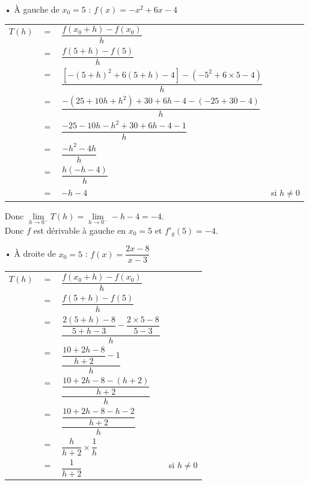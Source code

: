 \begin{itemize}
\item[•] À gauche de $x_0 = 5$ : $f(x) = -x^2 + 6x - 4$ \\

\begin{tabular}{llll}
$T(h)$ & $=$ & $\dfrac{f(x_0 + h) - f(x_0)}{h}$ & \\
& $=$ & $\dfrac{f(5 + h) - f(5)}{h}$ & \\
& $=$ & $\dfrac{\left[-\left(5+h\right)^2 + 6\left(5 + h\right)-4\right]-\left(-5^2 + 6 \times 5 - 4\right)}{h}$ & \\
& $=$ & $\dfrac{-\left(25 + 10h + h^2 \right) + 30 + 6h - 4 -\left(-25 + 30 -4\right)}{h}$ & \\
& $=$ & $\dfrac{-25 - 10h - h^2 + 30 + 6h -4 -1}{h}$ & \\
& $=$ & $\dfrac{-h^2 -4h}{h}$ & \\
& $=$ & $\dfrac{h\left(-h-4\right)}{h}$ & \\
& $=$ & $-h -4$ & si $h \neq 0$ \\
\end{tabular}

Donc $\lim\limits_{h \to 0^-} T(h) = \lim\limits_{h \to 0^-} -h-4 = -4$. \\

Donc $f$ est dérivable à gauche en $x_0 = 5$ et $f'_{g}\left(5\right) = -4$. \\

\item[•]  À droite de $x_0 = 5$ : $f(x) = \dfrac{2x-8}{x-3}$ \\

\begin{tabular}{llll}
$T(h)$ & $=$ & $\dfrac{f(x_0 + h) - f(x_0)}{h}$ & \vspace*{.3cm} \\
& $=$ & $\dfrac{f(5 + h) - f(5)}{h}$ & \vspace*{.3cm} \\
& $=$ & $\dfrac{\dfrac{2\left(5+h\right)-8}{5+ h - 3} - \dfrac{2 \times 5 -8}{5 -3}}{h}$ & \vspace*{.3cm} \\
& $=$ & $\dfrac{\dfrac{10 + 2h -8}{h + 2} - 1}{h}$ & \vspace*{.3cm} \\
& $=$ & $\dfrac{\dfrac{10 + 2h - 8 -\left(h + 2\right)}{h+2}}{h}$ &  \vspace*{.3cm} \\
& $=$ & $\dfrac{\dfrac{10 + 2h - 8 - h -2}{h+2}}{h}$ & \vspace*{.3cm} \\
& $=$ & $\dfrac{h}{h +2} \times \dfrac{1}{h}$ & \vspace*{.3cm} \\
& $=$ & $\dfrac{1}{h+2}$ & si $h \neq 0$ \vspace*{.3cm}\\
\end{tabular}


\end{itemize}
